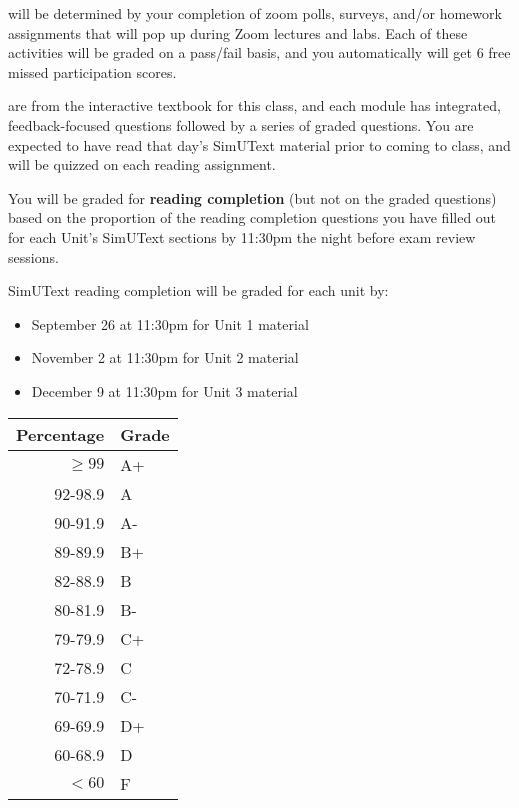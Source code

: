 \documentclass{tufte-handout}
\begin{document}
\begin{fullwidth}
\newpage

 will be determined by your completion of zoom polls, surveys, and/or homework assignments that will pop up during Zoom lectures and labs. Each of these activities will be graded on a pass/fail basis, and you automatically will get 6 free missed participation scores. 



 are from the interactive textbook for this class, and each module has integrated, feedback-focused questions followed by a series of graded questions. \color{blue}You are expected to have read that day's SimUText material prior to coming to class, and will be quizzed on each reading assignment. \color{black} 

\end{fullwidth}

You will be graded for \textbf{reading completion} (but not on the graded questions) based on the proportion of the reading completion questions you have filled out for each Unit's SimUText sections by 11:30pm the night before exam review sessions.



SimUText reading completion will be graded for each unit by:
\begin{itemize}
\item September 26 at 11:30pm for Unit 1 material
\item November 2 at 11:30pm for Unit 2 material 
\item December 9 at 11:30pm for Unit 3 material 
\end{itemize}


\begin{margintable}
\begin{tabular}{rl}
Percentage & Grade \\
\hline 
$\ge99$ & A+ \\
92-98.9 & A \\
90-91.9 & A- \\
89-89.9 & B+ \\
82-88.9 & B \\
80-81.9 & B- \\
79-79.9 & C+ \\
72-78.9 & C \\
70-71.9 & C- \\
69-69.9 & D+ \\
60-68.9 & D \\
$<60$ & F \\
\hline
\end{tabular}
\end{margintable}
\end{document}
